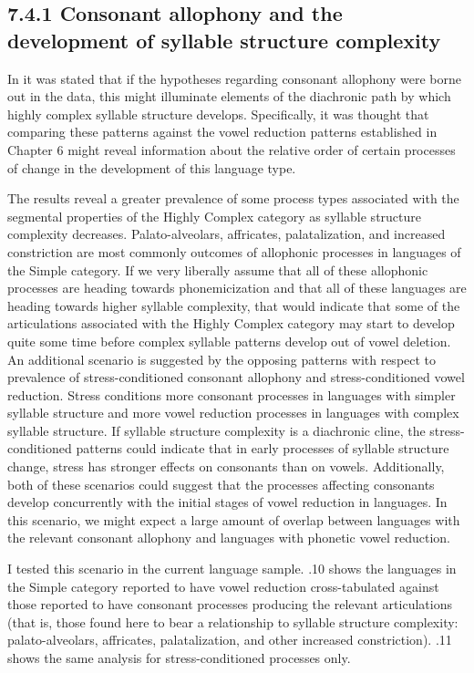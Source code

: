 \subsection{7.4.1 Consonant allophony and the development of syllable structure complexity} 

  In  it was stated that if the hypotheses regarding consonant allophony were borne out in the data, this might illuminate elements of the diachronic path by which highly complex syllable structure develops. Specifically, it was thought that comparing these patterns against the vowel reduction patterns established in Chapter 6 might reveal information about the relative order of certain processes of change in the development of this language type.

  The results reveal a greater prevalence of some process types associated with the segmental properties of the Highly Complex category as syllable structure complexity decreases. Palato-alveolars, affricates, palatalization, and increased constriction are most commonly outcomes of allophonic processes in languages of the Simple category. If we very liberally assume that all of these allophonic processes are heading towards phonemicization and that all of these languages are heading towards higher syllable complexity, that would indicate that some of the articulations associated with the Highly Complex category may start to develop quite some time before complex syllable patterns develop out of vowel deletion. An additional scenario is suggested by the opposing patterns with respect to prevalence of stress-conditioned consonant allophony and stress-conditioned vowel reduction. Stress conditions more consonant processes in languages with simpler syllable structure and more vowel reduction processes in languages with complex syllable structure. If syllable structure complexity is a diachronic cline, the stress-conditioned patterns could indicate that in early processes of syllable structure change, stress has stronger effects on consonants than on vowels. Additionally, both of these scenarios could suggest that the processes affecting consonants develop concurrently with the initial stages of vowel reduction in languages. In this scenario, we might expect a large amount of overlap between languages with the relevant consonant allophony and languages with phonetic vowel reduction.

  I tested this scenario in the current language sample. .10 shows the languages in the Simple category reported to have vowel reduction cross-tabulated against those reported to have consonant processes producing the relevant articulations (that is, those found here to bear a relationship to syllable structure complexity: palato-alveolars, affricates, palatalization, and other increased constriction). .11 shows the same analysis for stress-conditioned processes only.

